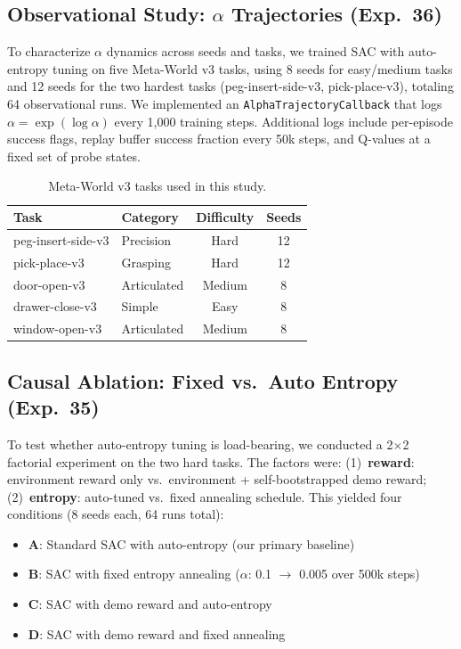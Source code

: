 \documentclass[twocolumn]{article}
\begin{document}
\subsection{Observational Study: $\alpha$ Trajectories (Exp.~36)}

To characterize $\alpha$ dynamics across seeds and tasks, we trained SAC with
auto-entropy tuning on five Meta-World v3 tasks, using 8 seeds for easy/medium
tasks and 12 seeds for the two hardest tasks (peg-insert-side-v3,
pick-place-v3), totaling 64 observational runs. We implemented an
\texttt{AlphaTrajectoryCallback} that logs $\alpha = \exp(\log\alpha)$ every
1,000 training steps. Additional logs include per-episode success flags, replay
buffer success fraction every 50k steps, and Q-values at a fixed set of probe
states.

\begin{table}[h]
\caption{Meta-World v3 tasks used in this study.}
\label{tab:tasks}
\centering
\small
\begin{tabular}{llcc}
\toprule
Task & Category & Difficulty & Seeds \\
\midrule
peg-insert-side-v3 & Precision & Hard   & 12 \\
pick-place-v3      & Grasping  & Hard   & 12 \\
door-open-v3       & Articulated & Medium & 8 \\
drawer-close-v3    & Simple    & Easy   & 8  \\
window-open-v3     & Articulated & Medium & 8 \\
\bottomrule
\end{tabular}
\end{table}

\subsection{Causal Ablation: Fixed vs.\ Auto Entropy (Exp.~35)}

To test whether auto-entropy tuning is load-bearing, we conducted a 2$\times$2
factorial experiment on the two hard tasks. The factors were:
(1)~\textbf{reward}: environment reward only vs.\ environment + self-bootstrapped
demo reward; (2)~\textbf{entropy}: auto-tuned vs.\ fixed annealing schedule.
This yielded four conditions (8 seeds each, 64 runs total):

\begin{itemize}
  \item \textbf{A}: Standard SAC with auto-entropy (our primary baseline)
  \item \textbf{B}: SAC with fixed entropy annealing ($\alpha$: 0.1 $\to$ 0.005 over 500k steps)
  \item \textbf{C}: SAC with demo reward and auto-entropy
  \item \textbf{D}: SAC with demo reward and fixed annealing
\end{itemize}
\end{document}
